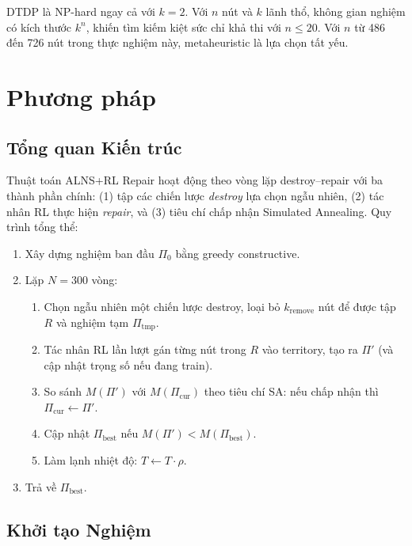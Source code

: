 \documentclass[12pt, a4paper]{article}
\begin{document}
DTDP là NP-hard ngay cả với $k = 2$. Với $n$ nút và $k$ lãnh thổ, không gian
nghiệm có kích thước $k^n$, khiến tìm kiếm kiệt sức chỉ khả thi với $n \leq 20$.
Với $n$ từ 486 đến 726 nút trong thực nghiệm này, metaheuristic là lựa chọn tất yếu.

\section{Phương pháp}
\label{sec:method}

\subsection{Tổng quan Kiến trúc}

Thuật toán ALNS+RL Repair hoạt động theo vòng lặp destroy--repair với ba thành
phần chính: (1) tập các chiến lược \emph{destroy} lựa chọn ngẫu nhiên,
(2) tác nhân RL thực hiện \emph{repair}, và (3) tiêu chí chấp nhận
Simulated Annealing. Quy trình tổng thể:

\begin{enumerate}
  \item Xây dựng nghiệm ban đầu $\Pi_0$ bằng greedy constructive.
  \item Lặp $N = 300$ vòng:
    \begin{enumerate}
      \item Chọn ngẫu nhiên một chiến lược destroy, loại bỏ $k_{\text{remove}}$
            nút để được tập $R$ và nghiệm tạm $\Pi_{\text{tmp}}$.
      \item Tác nhân RL lần lượt gán từng nút trong $R$ vào territory, tạo ra
            $\Pi'$ (và cập nhật trọng số nếu đang train).
      \item So sánh $M(\Pi')$ với $M(\Pi_{\text{cur}})$ theo tiêu chí SA:
            nếu chấp nhận thì $\Pi_{\text{cur}} \leftarrow \Pi'$.
      \item Cập nhật $\Pi_{\text{best}}$ nếu $M(\Pi') < M(\Pi_{\text{best}})$.
      \item Làm lạnh nhiệt độ: $T \leftarrow T \cdot \rho$.
    \end{enumerate}
  \item Trả về $\Pi_{\text{best}}$.
\end{enumerate}

\subsection{Khởi tạo Nghiệm}
\end{document}
